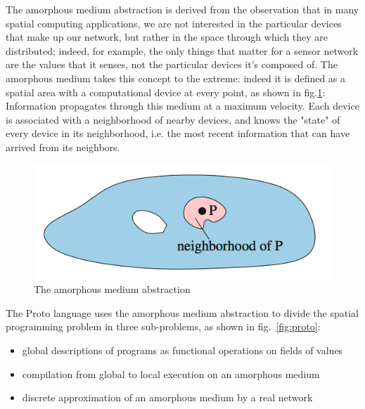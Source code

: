 The amorphous medium abstraction\cite{medium} is derived from the observation that in many spatial computing applications, we are not interested in the particular devices that make up our network, but rather in the space through which they are distributed; indeed, for example, the only things that matter for a sensor network are the values that it senses, not the particular devices it's composed of.
The amorphous medium\cite{medium} takes this concept to the extreme: indeed it is defined as a spatial area with a computational device at every point, as shown in fig.\ref{fig:medium}: Information propagates through this medium at a maximum velocity. Each device is associated with a neighborhood of nearby devices, and knows the "state" of every device in its neighborhood, i.e. the most recent information that can have arrived from its neighbors.



\begin{figure}[H]
  \centering
  \includegraphics[width=\linewidth]{pictures/ProtoMedium.png}
  \caption{The amorphous medium abstraction}
  \label{fig:medium}
\end{figure}



The Proto\cite{proto} language uses the amorphous medium abstraction\cite{medium} to divide the spatial programming problem in three sub-problems, as shown in fig.~\ref{fig:proto}:

\begin{itemize}
\itemsep2pt
\item{
global descriptions of programs as functional operations on fields of values
}
\item{
compilation from global to local execution on an amorphous medium
}
\item{
discrete approximation of an amorphous medium by a real network
}
\end{itemize}


